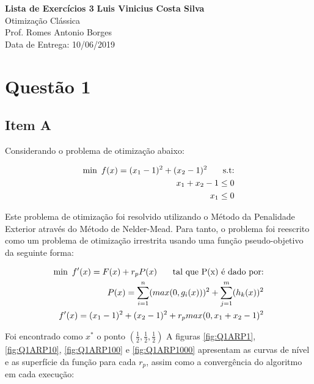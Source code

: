 \documentclass[a4paper, 12pt]{article}
\begin{document}
\noindent
\large\textbf{Lista de Exercícios 3} \hfill \textbf{Luis Vinicius Costa Silva} \\
\normalsize Otimização Clássica \\
Prof. Romes Antonio Borges \\
\hfill Data de Entrega: 10/06/2019
\tableofcontents

\section*{Questão 1}
\subsection*{Item A}
Considerando o problema de otimização abaixo:


\begin{align*}
\begin{split}
\text{min\phantom{0}} f(x) = (x_1 - 1)^2 + (x_2 - 1)^2 \text{\phantom{000} s.t:} \\
x_1 + x_2 -1 \leq 0	 \\
x_1 \leq 0
\end{split}
\end{align*}

Este problema de otimização foi resolvido utilizando o Método da Penalidade Exterior através do Método de Nelder-Mead. Para tanto, o problema foi reescrito como um problema de otimização irrestrita usando uma função pseudo-objetivo da seguinte forma:

\begin{align*}
\begin{split}
\text{min\phantom{0}} f'(x) = F(x) + r_p P(x) \text{\phantom{000} tal que P(x) é dado por:} \\
P(x) = \sum_{i=1}^{n} (max(0,g_i(x)))^2 + \sum_{j=1}^{m} (h_k(x))^2 \\
f'(x) = (x_1-1)^2 + (x_2-1)^2 + r_p max (0,x_1+x_2-1)^2
\end{split}
\end{align*}


Foi encontrado como $x^*$ o ponto $(\frac{1}{2},\frac{1}{2},\frac{1}{2})$ A figuras \ref{fig:Q1ARP1}, \ref{fig:Q1ARP10}, \ref{fig:Q1ARP100} e \ref{fig:Q1ARP1000} apresentam as curvas de nível e as superfície da função para cada $r_p$, assim como a convergência do algoritmo em cada execução:
\end{document}
